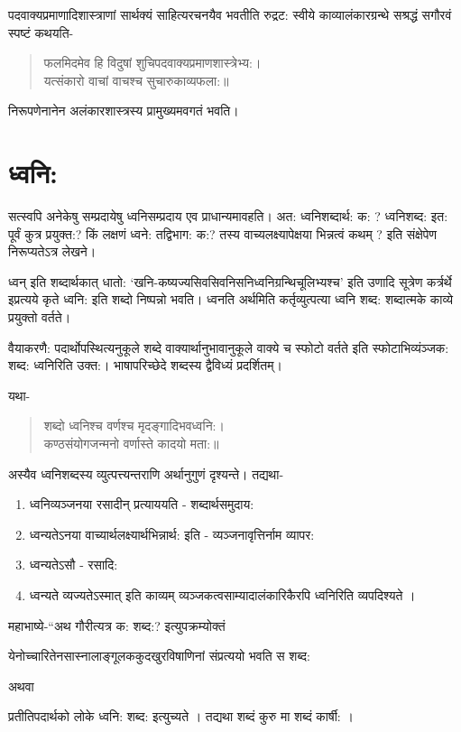 पदवाक्यप्रमाणादिशास्त्राणां सार्थक्यं साहित्यरचनयैव भवतीति रुद्रट: स्वीये काव्यालंकारग्रन्थे सश्रद्धं सगौरवं स्पष्टं कथयति-
\begin{verse}
फलमिदमेव हि विदुषां शुचिपदवाक्यप्रमाणशास्त्रेभ्य:।\\
यत्संकारो वाचां वाचश्च सुचारुकाव्यफला:॥
\end{verse}
निरूपणेनानेन अलंकारशास्त्रस्य प्रामुख्यमवगतं भवति।

\section*{ध्वनि:}

सत्स्वपि अनेकेषु सम्प्रदायेषु ध्वनिसम्प्रदाय एव प्राधान्यमावहति। अत: ध्वनिशब्दार्थ: क: ? ध्वनिशब्द: इत: पूर्वं कुत्र प्रयुक्त:? किं लक्षणं ध्वने: तद्विभाग: क:? तस्य वाच्यलक्ष्यापेक्षया भिन्नत्वं कथम् ? इति संक्षेपेण निरूप्यतेऽत्र लेखने।

ध्वन् इति शब्दार्थकात् धातो: ‘खनि-कष्यज्यसिवसिवनिसनिध्वनिग्रन्थिचूलिभ्यश्च’ इति उणादि सूत्रेण कर्त्रर्थे इप्रत्यये कृते ध्वनि: इति शब्दो निष्पन्नो भवति। ध्वनति अर्थमिति कर्तृव्युत्पत्या ध्वनि शब्द: शब्दात्मके काव्ये प्रयुक्तो वर्तते।

वैयाकरणै: पदार्थोपस्थित्यनुकूले शब्दे वाक्यार्थानुभावानुकूले वाक्ये च स्फोटो वर्तते इति स्फोटाभिव्यंञ्जक: शब्द: ध्वनिरिति उक्त:। भाषापरिच्छेदे शब्दस्य द्वैविध्यं प्रदर्शितम्।

यथा-
\begin{verse}
शब्दो ध्वनिश्च वर्णश्च मृदङ्गादिभवध्वनि:।\\
कण्ठसंयोगजन्मनो वर्णास्ते कादयो मता:॥
\end{verse}
अस्यैव ध्वनिशब्दस्य व्युत्पत्त्यन्तराणि अर्थानुगुणं दृश्यन्ते। तद्यथा-
\begin{enumerate}
\item ध्वनिव्यञ्जनया रसादीन् प्रत्याययति - शब्दार्थसमुदाय:
\item ध्वन्यतेऽनया वाच्यार्थलक्ष्यार्थभिन्नार्थ: इति - व्यञ्जनावृत्तिर्नाम व्यापर: 
\item ध्वन्यतेऽसौ - रसादि:
\item ध्वन्यते व्यज्यतेऽस्मात् इति काव्यम् व्यञ्जकत्वसाम्यादालंकारिकैरपि ध्वनिरिति व्यपदिश्यते ।
\end{enumerate}
महाभाष्ये-“अथ गौरीत्यत्र क: शब्द:? इत्युपक्रम्योक्तं 

येनोच्चारितेनसास्नालाङ्गूलककुदखुरविषाणिनां संप्रत्ययो भवति स शब्द:

अथवा

प्रतीतिपदार्थको लोके ध्वनि: शब्द: इत्युच्यते । तद्यथा शब्दं कुरु मा शब्दं कार्षी: ।


